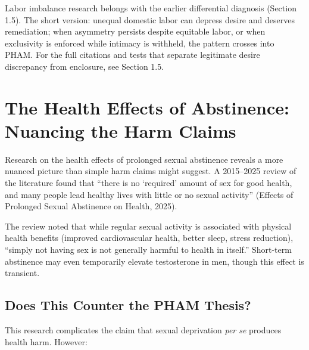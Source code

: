 \documentclass[12pt,openany]{book}
\numberwithin{equation}{chapter}
\begin{document}
Labor imbalance research belongs with the earlier differential diagnosis (Section 1.5). The short version: unequal domestic labor can depress desire and deserves remediation; when asymmetry persists despite equitable labor, or when exclusivity is enforced while intimacy is withheld, the pattern crosses into PHAM. For the full citations and tests that separate legitimate desire discrepancy from enclosure, see Section 1.5.

\section{The Health Effects of Abstinence: Nuancing the Harm Claims}

Research on the health effects of prolonged sexual abstinence reveals a more nuanced picture than simple harm claims might suggest. A 2015--2025 review of the literature found that ``there is no `required' amount of sex for good health, and many people lead healthy lives with little or no sexual activity'' (Effects of Prolonged Sexual Abstinence on Health, 2025).

The review noted that while regular sexual activity is associated with physical health benefits (improved cardiovascular health, better sleep, stress reduction), ``simply not having sex is not generally harmful to health in itself.'' Short-term abstinence may even temporarily elevate testosterone in men, though this effect is transient.

\subsection{Does This Counter the PHAM Thesis?}

This research complicates the claim that sexual deprivation \textit{per se} produces health harm. However:
\end{document}
